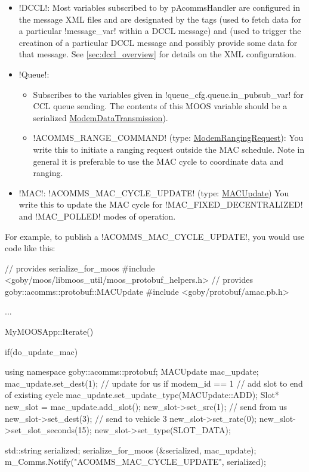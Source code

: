 \begin{itemize}
\item !DCCL!: Most variables subscribed to by pAcommsHandler are configured in the message XML files and are designated by the tags  (used to fetch data for a particular !message_var! within a DCCL message) and  (used to trigger the creatinon of a particular DCCL message and possibly provide some data for that message. See \ref{sec:dccl_overview} for details on the XML configuration. 
\item !Queue!:
\begin{itemize}
\item Subscribes to the variables given in !queue_cfg.queue.in_pubsub_var! for CCL queue sending. The contents of this MOOS variable should be a serialized \href{http://gobysoft.com/doc/1.0/modem__message_8proto_source.html}{ModemDataTransmission}). 
\item !ACOMMS_RANGE_COMMAND! (type: \href{http://gobysoft.com/doc/1.0/modem__message_8proto_source.html}{ModemRangingRequest}): You write this to initiate a ranging request outside the MAC schedule. Note in general it is preferable to use the MAC cycle to coordinate data and ranging.
\end{itemize}
\item !MAC!: !ACOMMS_MAC_CYCLE_UPDATE! (type: \href{http://gobysoft.com/doc/1.0/amac_8proto_source.html}{MACUpdate}) You write this to update the MAC cycle for !MAC_FIXED_DECENTRALIZED! and !MAC_POLLED! modes of operation.
\end{itemize}

For example, to publish a !ACOMMS_MAC_CYCLE_UPDATE!, you would use code like this:
\begin{boxedverbatim}
// provides serialize_for_moos
#include <goby/moos/libmoos_util/moos_protobuf_helpers.h>
// provides goby::acomms::protobuf::MACUpdate
#include <goby/protobuf/amac.pb.h>

...

MyMOOSApp::Iterate()
{
  if(do_update_mac)
  { 
    using namespace goby::acomms::protobuf;
    MACUpdate mac_update;
    mac_update.set_dest(1); // update for us if modem_id == 1
    // add slot to end of existing cycle
    mac_update.set_update_type(MACUpdate::ADD);
    Slot* new_slot = mac_update.add_slot();
    new_slot->set_src(1);  // send from us
    new_slot->set_dest(3); // send to vehicle 3
    new_slot->set_rate(0);
    new_slot->set_slot_seconds(15);
    new_slot->set_type(SLOT_DATA);
    
    std::string serialized;
    serialize_for_moos (&serialized, mac_update);
    m_Comms.Notify("ACOMMS_MAC_CYCLE_UPDATE", serialized);
  }
}
\end{boxedverbatim}
\resetbvlinenumber

